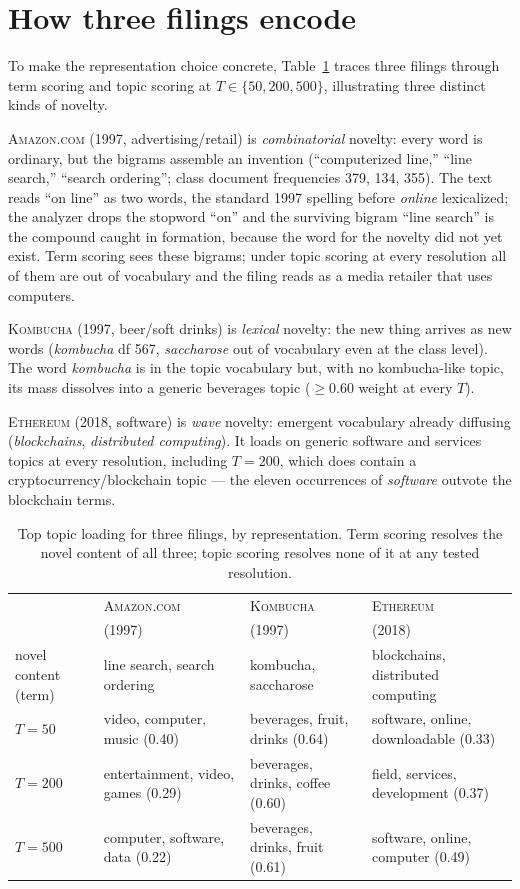 \documentclass[11pt]{article}
\begin{document}
\section{How three filings encode}\label{app:exhibit}

To make the representation choice concrete, Table~\ref{tab:exhibit} traces
three filings through term scoring and topic scoring at $T \in \{50, 200,
500\}$, illustrating three distinct kinds of novelty.

\textsc{Amazon.com} (1997, advertising/retail) is \emph{combinatorial}
novelty: every word is ordinary, but the bigrams assemble an invention
(``computerized line,'' ``line search,'' ``search ordering''; class
document frequencies 379, 134, 355). The text reads ``on line'' as two
words, the standard 1997 spelling before \emph{online} lexicalized; the
analyzer drops the stopword ``on'' and the surviving bigram ``line
search'' is the compound caught in formation, because the word for the
novelty did not yet exist. Term scoring sees these bigrams; under topic
scoring at every resolution all of them are out of vocabulary and the
filing reads as a media retailer that uses computers.

\textsc{Kombucha} (1997, beer/soft drinks) is \emph{lexical} novelty: the
new thing arrives as new words (\emph{kombucha} df 567, \emph{saccharose}
out of vocabulary even at the class level). The word \emph{kombucha} is in
the topic vocabulary but, with no kombucha-like topic, its mass dissolves
into a generic beverages topic ($\geq 0.60$ weight at every $T$).

\textsc{Ethereum} (2018, software) is \emph{wave} novelty: emergent
vocabulary already diffusing (\emph{blockchains}, \emph{distributed
computing}). It loads on generic software and services topics at every
resolution, including $T = 200$, which does contain a
cryptocurrency/blockchain topic --- the eleven occurrences of
\emph{software} outvote the blockchain terms.

\begin{table}[t]\centering\small
\caption{Top topic loading for three filings, by representation. Term
scoring resolves the novel content of all three; topic scoring resolves
none of it at any tested resolution.}
\label{tab:exhibit}
\begin{tabular}{lp{3.1cm}p{3.1cm}p{3.1cm}}
\toprule
& \textsc{Amazon.com} & \textsc{Kombucha} & \textsc{Ethereum} \\
& (1997) & (1997) & (2018) \\
\midrule
novel content (term) & line search, search ordering & kombucha, saccharose & blockchains, distributed computing \\
$T=50$ & video, computer, music (0.40) & beverages, fruit, drinks (0.64) & software, online, downloadable (0.33) \\
$T=200$ & entertainment, video, games (0.29) & beverages, drinks, coffee (0.60) & field, services, development (0.37) \\
$T=500$ & computer, software, data (0.22) & beverages, drinks, fruit (0.61) & software, online, computer (0.49) \\
\bottomrule
\end{tabular}
\end{table}
\end{document}
